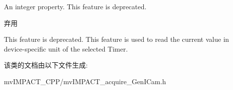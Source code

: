 An integer property. This feature is deprecated. 

\begin{DoxyRefDesc}{弃用}
\item[\hyperlink{deprecated__deprecated000053}{弃用}]This feature is deprecated. This feature is used to read the current value in device-\/specific unit of the selected Timer. \end{DoxyRefDesc}


该类的文档由以下文件生成\+:\begin{DoxyCompactItemize}
\item 
mv\+I\+M\+P\+A\+C\+T\+\_\+\+C\+P\+P/mv\+I\+M\+P\+A\+C\+T\+\_\+acquire\+\_\+\+Gen\+I\+Cam.\+h\end{DoxyCompactItemize}
